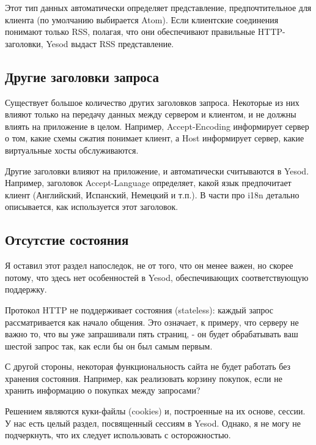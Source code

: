 Этот тип данных автоматически определяет представление, предпочтительное для клиента (по умолчанию выбирается Atom). Если клиентские соединения понимают только RSS, полагая, что они обеспечивают правильные HTTP-заголовки, Yesod выдаст RSS представление.

\subsection{Другие заголовки запроса}

Существует большое количество других заголовков запроса. Некоторые из них влияют только на передачу данных между сервером и клиентом, и не должны влиять на приложение в целом. Например, Accept-Encoding информирует сервер о том, какие схемы сжатия понимает клиент, а Host информирует сервер, какие виртуальные хосты обслуживаются.

Другие заголовки влияют на приложение, и автоматически считываются в Yesod. Например, заголовок Accept-Language определяет, какой язык предпочитает клиент (Английский, Испанский, Немецкий и т.п.). В части про i18n детально описывается, как используется этот заголовок.

\subsection{Отсутстие состояния}

Я оставил этот раздел напоследок, не от того, что он менее важен, но скорее потому, что здесь нет особенностей в Yesod, обеспечивающих соответствующую поддержку.

Протокол HTTP не поддерживает состояния (stateless): каждый запрос рассматривается как начало общения. Это означает, к примеру, что серверу не важно то, что вы уже запрашивали пять страниц, - он будет обрабатывать ваш шестой запрос так, как если бы он был самым первым.

С другой стороны, некоторая функциональность сайта не будет работать без хранения состояния. Например, как реализовать корзину покупок, если не хранить информацию о покупках между запросами?

Решением являются куки-файлы (cookies) и, построенные на их основе, сессии. У нас есть целый раздел, посвященный сессиям в Yesod. Однако, я не могу не подчеркнуть, что их следует использовать с осторожностью.

